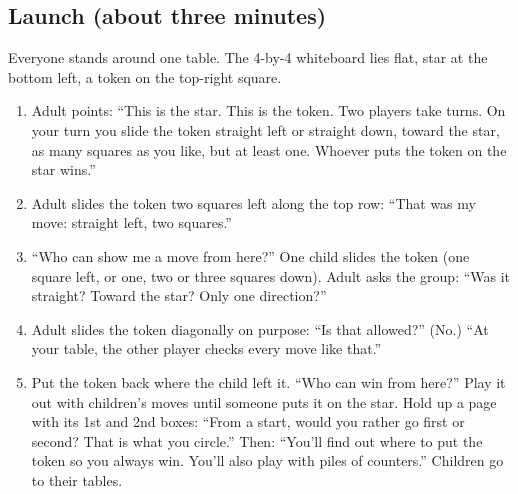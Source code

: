 \documentclass[10pt]{article}
\begin{document}
\subsection{Launch (about three minutes)}
Everyone stands around one table. The 4-by-4 whiteboard lies flat, star at the bottom left, a token on the top-right square.
\begin{enumerate}[leftmargin=15pt]
\item Adult points: ``This is the star. This is the token. Two players take turns. On your turn you slide the token straight left or straight down, toward the star, as many squares as you like, but at least one. Whoever puts the token on the star wins.''
\item Adult slides the token two squares left along the top row: ``That was my move: straight left, two squares.''
\item ``Who can show me a move from here?'' One child slides the token (one square left, or one, two or three squares down). Adult asks the group: ``Was it straight? Toward the star? Only one direction?''
\item Adult slides the token diagonally on purpose: ``Is that allowed?'' (No.) ``At your table, the other player checks every move like that.''
\item Put the token back where the child left it. ``Who can win from here?'' Play it out with children's moves until someone puts it on the star. Hold up a page with its 1st and 2nd boxes: ``From a start, would you rather go first or second? That is what you circle.'' Then: ``You'll find out where to put the token so you always win. You'll also play with piles of counters.'' Children go to their tables.
\end{enumerate}
\end{document}
